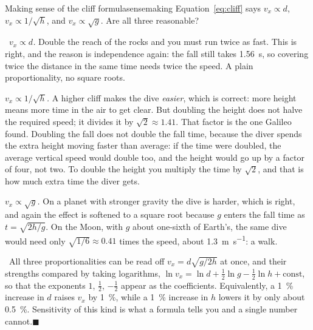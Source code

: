 \documentclass[11pt,twoside,openany]{book}
\newcommand{\viewtag}[3]{\fcolorbox{#2}{#3}{\footnotesize\textbf{\textcolor{#2}{#1}}}}
\newcommand{\elemtag}{\viewtag{Elementary}{elemcol}{elempale}}
\newcommand{\calctag}{\viewtag{Calculus}{calccol}{calcpale}}
\newcommand{\elem}{\par\medskip\noindent\elemtag\ }
\newcommand{\calc}{\par\medskip\noindent\calctag\ }
\newcommand{\qed}{\hfill$\blacksquare$}
\begin{document}
\begin{example}{Making sense of the cliff formula}{sensemaking}
Equation~\eqref{eq:cliff} says $v_x \propto d$, $v_x \propto 1/\sqrt{h}$, and $v_x \propto \sqrt{g}$. Are all three reasonable?

\elem \emph{$v_x \propto d$.} Double the reach of the rocks and you must run twice as fast. This is right, and the reason is independence again: the fall still takes \SI{1.56}{\second}, so covering twice the distance in the same time needs twice the speed. A plain proportionality, no square roots.

\emph{$v_x \propto 1/\sqrt{h}$.} A higher cliff makes the dive \emph{easier}, which is correct: more height means more time in the air to get clear. But doubling the height does not halve the required speed; it divides it by $\sqrt{2} \approx \num{1.41}$. That factor is the one Galileo found. Doubling the fall does not double the fall time, because the diver spends the extra height moving faster than average: if the time were doubled, the average vertical speed would double too, and the height would go up by a factor of four, not two. To double the height you multiply the time by $\sqrt2$, and that is how much extra time the diver gets.

\emph{$v_x \propto \sqrt{g}$.} On a planet with stronger gravity the dive is harder, which is right, and again the effect is softened to a square root because $g$ enters the fall time as $t = \sqrt{2h/g}$. On the Moon, with $g$ about one-sixth of Earth's, the same dive would need only $\sqrt{1/6} \approx \num{0.41}$ times the speed, about \SI{1.3}{\metre\per\second}: a walk.

\calc All three proportionalities can be read off $v_x = d\sqrt{g/2h}$ at once, and their strengths compared by taking logarithms, $\ln v_x = \ln d + \tfrac12\ln g - \tfrac12 \ln h + \text{const}$, so that the exponents $1$, $\tfrac12$, $-\tfrac12$ appear as the coefficients. Equivalently, a \SI{1}{\percent} increase in $d$ raises $v_x$ by \SI{1}{\percent}, while a \SI{1}{\percent} increase in $h$ lowers it by only about \SI{0.5}{\percent}. Sensitivity of this kind is what a formula tells you and a single number cannot.\qed
\end{example}
\end{document}
